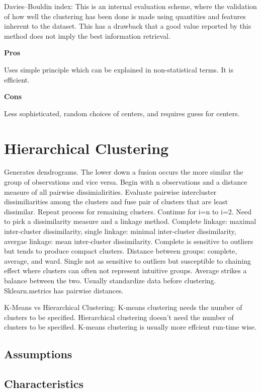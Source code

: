 \documentclass[]{book}
\begin{document}
Davies--Bouldin index: This is an internal evaluation scheme, where the
validation of how well the clustering has been done is made using
quantities and features inherent to the dataset. This has a drawback
that a good value reported by this method does not imply the best
information retrieval.

\textbf{Pros}

Uses simple principle which can be explained in non-statistical terms.
It is efficient.

\textbf{Cons}

Less sophisticated, random choices of centers, and requires guess for
centers.

\section{Hierarchical Clustering}\label{hierarchical-clustering}

Generates dendrograms. The lower down a fusion occurs the more similar
the group of observations and vice versa. Begin with n observations and
a distance measure of all pairwise dissimialirities. Evaluate pairwise
intercluster dissimiliarities among the clusters and fuse pair of
clusters that are least dissimilar. Repeat process for remaining
clusters. Continue for i=n to i=2. Need to pick a dissimilarity measure
and a linkage method. Complete linkage: maximal inter-cluster
dissimilarity, single linkage: minimal inter-cluster dissimilarity,
avergae linkage: mean inter-cluster dissimilarity. Complete is sensitive
to outliers but tends to produce compact clusters. Distance between
groups: complete, average, and ward. Single not as sensitive to outliers
but susceptible to chaining effect where clusters can often not
represent intuitive groups. Average strikes a balance between the two.
Usually standardize data before clustering. Sklearn.metrics has pairwise
distances.

K-Means vs Hierarchical Clustering: K-means clustering needs the number
of clusters to be speciﬁed. Hierarchical clustering doesn't need the
number of clusters to be speciﬁed. K-means clustering is usually more
effcient run-time wise.

\subsection{Assumptions}\label{assumptions-1}

\subsection{Characteristics}\label{characteristics}
\end{document}

